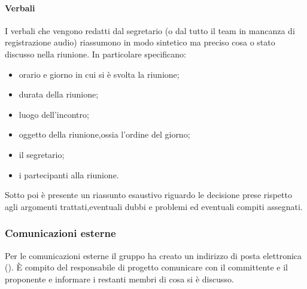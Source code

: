 \paragraph{Verbali} I verbali che vengono redatti dal segretario (o dal tutto il team in mancanza di registrazione audio) riassumono in modo sintetico ma preciso cosa o stato discusso nella riunione. In particolare specificano:
\begin{itemize}
	\item orario e giorno in cui si è svolta la riunione;
	\item durata della riunione;
	\item luogo dell'incontro;
	\item oggetto della riunione,ossia l'ordine del giorno;
	\item il segretario;
	\item i partecipanti alla riunione.
\end{itemize}
Sotto poi è presente un riassunto esaustivo riguardo le decisione prese rispetto agli argomenti trattati,eventuali dubbi e problemi ed eventuali compiti assegnati.


\subsubsection{Comunicazioni esterne}
Per le comunicazioni esterne il gruppo ha creato un indirizzo di posta elettronica (\email).
È compito del responsabile di progetto comunicare con il committente e il proponente e informare i restanti membri di cosa si è discusso.


